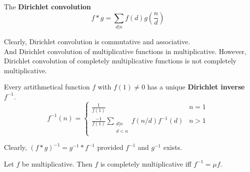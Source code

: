 \begin{definition}
	The \textbf{Dirichlet convolution}
	$$ f \ast g = \sum_{d|n} f(d)g\left(\frac{n}{d}\right)$$
\end{definition}
	Clearly, Dirichlet convolution is commutative and associative.\\
	And Dirichlet convolution of multiplicative functions in multiplicative. However, Dirichlet convolution of completely multiplicative functions is not completely multiplicative.
\begin{definition}
	Every artithmetical function $f$ with $f(1) \ne 0$ has a unique \textbf{Dirichlet inverse} $f^{-1}$.
	$$ f^{-1}(n) = \begin{cases} \frac{1}{f(1)} & n = 1 \\ \frac{-1}{f(1)} \displaystyle \sum_{\substack{d|n \\ d < n}} f(n/d)f^{-1}(d) & n > 1 \end{cases} $$
\end{definition}

	Clearly, $(f \ast g)^{-1} = g^{-1} \ast f^{-1}$ provided $f^{-1}$ and $g^{-1}$ exists.

\begin{theorem}
	Let $f$ be multiplicative.
	Then $f$ is completely multiplicative iff $f^{-1} = \mu f$.
\end{theorem}
